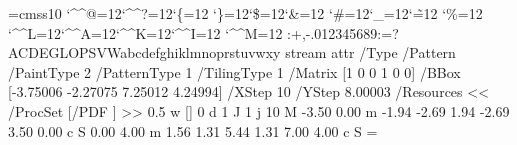 \font\THFa=cmss10
\begingroup
\catcode`\^^@=12\catcode`\^^?=12\catcode`\{=12
\catcode`\}=12\catcode`\$=12\catcode`\&=12
\catcode`\#=12\catcode`\_=12\catcode`\~=12
\catcode`\%=12
\catcode`\^^L=12\catcode`\^^A=12\catcode`\^^K=12\catcode`\^^I=12
\catcode`\^^M=12
\THFa:+,-.012345689:=?ACDEGLOPSVWabcdefghiklmnoprstuvwxy\endinclude\endgroup
\immediate\pdfobj stream attr {/Type /Pattern
/PaintType 2 /PatternType 1 /TilingType 1
/Matrix [1 0 0 1 0 0]
/BBox [-3.75006 -2.27075 7.25012 4.24994]
/XStep 10
/YStep 8.00003
/Resources << /ProcSet [/PDF ] >> } {
0.5 w
[] 0 d
1 J
1 j
10 M
-3.50 0.00 m
-1.94 -2.69 1.94 -2.69 3.50 0.00 c
S
0.00 4.00 m
1.56 1.31 5.44 1.31 7.00 4.00 c
S
} \newcount \THPa\THPa=\pdflastobj
